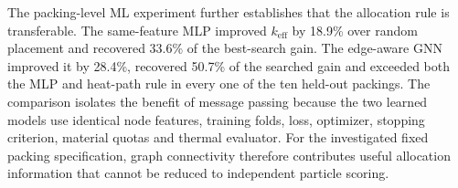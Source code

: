 \documentclass[12pt,a4paper]{article}
\begin{document}
	The packing-level ML experiment further establishes that the allocation rule is
	transferable. The same-feature MLP improved $k_{\mathrm{eff}}$ by 18.9\% over
	random placement and recovered 33.6\% of the best-search gain. The edge-aware
	GNN improved it by 28.4\%, recovered 50.7\% of the searched gain and exceeded
	both the MLP and heat-path rule in every one of the ten held-out packings. The
	comparison isolates the benefit of message passing because the two learned
	models use identical node features, training folds, loss, optimizer, stopping
	criterion, material quotas and thermal evaluator. For the investigated fixed
	packing specification, graph connectivity therefore contributes useful
	allocation information that cannot be reduced to independent particle scoring.
	
%	
%	
%		
%		
%	
\end{document}
